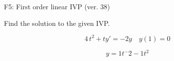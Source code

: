 \begin{exercise}
  \begin{exerciseTitle}F5: First order linear IVP (ver. 38)\end{exerciseTitle}
  \begin{exerciseStatement}
    
Find the solution to the given IVP.

    
\[4 \, t^{2} +ty'= -2 y \hspace{1em} y( 1 ) = 0\]

  \end{exerciseStatement}
  \begin{exerciseAnswer}
    
\[y= 1 t^ -2 -1 t^{2}\]

  \end{exerciseAnswer}
\end{exercise}